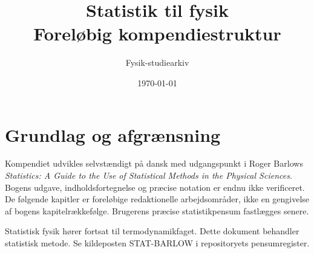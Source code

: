 \documentclass[11pt,a4paper,oneside]{book}
\title{Statistik til fysik\\[4mm]\large Foreløbig kompendiestruktur}
\author{Fysik-studiearkiv}
\date{\today}
\begin{document}
\frontmatter
\maketitle
\chapter*{Grundlag og afgrænsning}
Kompendiet udvikles selvstændigt på dansk med udgangspunkt i Roger Barlows
\emph{Statistics: A Guide to the Use of Statistical Methods in the Physical Sciences}.
Bogens udgave, indholdsfortegnelse og præcise notation er endnu ikke verificeret.
De følgende kapitler er foreløbige redaktionelle arbejdsområder, ikke en gengivelse
 af bogens kapitelrækkefølge. Brugerens præcise statistikpensum fastlægges senere.

Statistisk fysik hører fortsat til termodynamikfaget. Dette dokument behandler
statistisk metode. Se kildeposten STAT-BARLOW i repositoryets pensumregister.
\tableofcontents
\mainmatter






\end{document}
